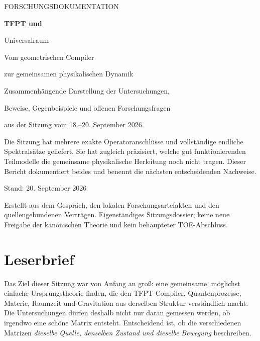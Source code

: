 \documentclass[11pt,a4paper,oneside,parskip=half,headings=normal,numbers=noenddot,bibliography=totoc]{scrreprt}
\newcommand{\finding}[2]{\begin{tcolorbox}[enhanced,breakable,colback=pale,colframe=teal,boxrule=0pt,borderline west={2pt}{0pt}{teal},arc=0mm,left=3mm,right=3mm,top=2mm,bottom=2mm,title={#1},coltitle=ink,colbacktitle=pale,fonttitle=\sffamily\bfseries]#2\end{tcolorbox}}
\begin{document}
\hypersetup{pageanchor=false}
\begin{titlepage}
\color{ink}
{\sffamily\large FORSCHUNGSDOKUMENTATION\par}
\vspace{17mm}
{\sffamily\bfseries\fontsize{32}{37}\selectfont TFPT und\par Universalraum\par}
\vspace{7mm}
{\sffamily\Large Vom geometrischen Compiler\par zur gemeinsamen physikalischen Dynamik\par}
\vspace{12mm}
\par
\vspace{9mm}
{\large Zusammenhängende Darstellung der Untersuchungen,\par Beweise, Gegenbeispiele und offenen Forschungsfragen\par aus der Sitzung vom 18.--20. September 2026.\par}
\vfill
\finding{Was dieser Bericht leistet}{Die Sitzung hat mehrere exakte Operatoranschlüsse und vollständige endliche Spektralsätze geliefert. Sie hat zugleich präzisiert, welche gut funktionierenden Teilmodelle die gemeinsame physikalische Herleitung noch nicht tragen. Dieser Bericht dokumentiert beides und benennt die nächsten entscheidenden Nachweise.}
\vspace{5mm}
{\sffamily Stand: 20. September 2026\par}
{\small Erstellt aus dem Gespräch, den lokalen Forschungsartefakten und den quellengebundenen Verträgen. Eigenständiges Sitzungsdossier; keine neue Freigabe der kanonischen Theorie und kein behaupteter TOE-Abschluss.\par}
\end{titlepage}
\hypersetup{pageanchor=true}
\chapter*{Leserbrief}
Das Ziel dieser Sitzung war von Anfang an groß: eine gemeinsame, möglichst einfache Ursprungstheorie finden, die den TFPT-Compiler, Quantenprozesse, Materie, Raumzeit und Gravitation aus derselben Struktur verständlich macht. Die Untersuchungen dürfen deshalb nicht nur daran gemessen werden, ob irgendwo eine schöne Matrix entsteht. Entscheidend ist, ob die verschiedenen Matrizen \emph{dieselbe Quelle, denselben Zustand und dieselbe Bewegung} beschreiben.
\end{document}
